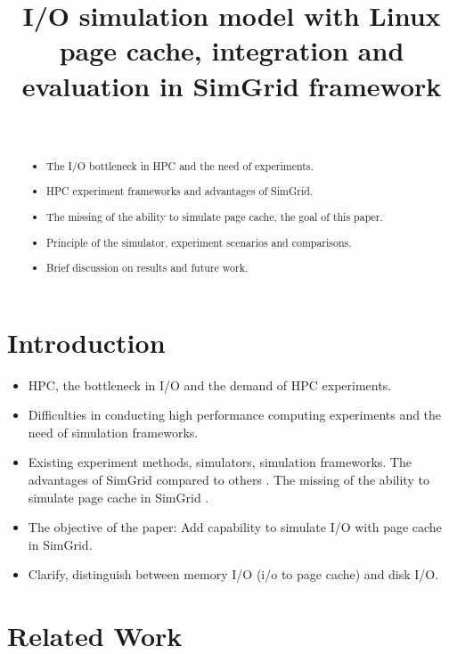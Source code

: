 \documentclass[conference]{IEEEtran}
\begin{document}
\title{I/O simulation model with Linux page cache, integration and evaluation in SimGrid framework}

\author{\\
}

\maketitle

	\begin{abstract}
		\begin{itemize}
			\item The I/O bottleneck in HPC and the need of experiments.
			\item HPC experiment frameworks and advantages of SimGrid.
			\item The missing of the ability to simulate page cache, the goal of this paper.
			\item Principle of the simulator, experiment scenarios and comparisons.
			\item Brief discussion on results and future work.
		\end{itemize}
	\end{abstract}

	\section{Introduction}
		\begin{itemize}
			\item HPC, the bottleneck in I/O and the demand of HPC experiments. 
			\item Difficulties in conducting high performance computing experiments and the need of simulation frameworks.
			\item Existing experiment methods, simulators, simulation frameworks. The advantages of SimGrid compared to others \cite{casanova2008, lebre2015}. The missing of the ability to simulate page cache in SimGrid \cite{lebre2015}.
			\item The objective of the paper: Add capability to simulate I/O with page cache in SimGrid.
			\item Clarify, distinguish between memory I/O (i/o to page cache) and disk I/O.
		\end{itemize}
	\section{Related Work}			
		
\end{document}
